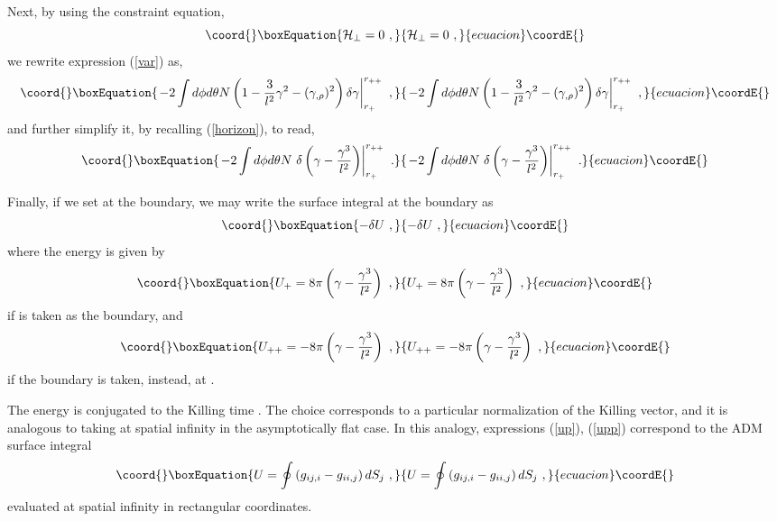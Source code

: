 \documentclass[a4paper,preprintnumbers,amsmath,amssymb]{revtex4}
\begin{document}
Next, by using the constraint equation,
\begin{equation}\coord{}\boxEquation{
{\cal H}_\perp = 0  \ ,
\label{constraint}
}{
{\cal H}_\perp = 0  \ ,
}{ecuacion}\coordE{}\end{equation}
we rewrite expression  (\ref{var}) as,
\begin{equation}\coord{}\boxEquation{
\left. -2 \int d\phi d\theta N \left(1-\frac{3}{l^2}\gamma^2 -
(\gamma_{,\rho})^2 \right)  \delta \gamma \right|^{r_{++}}_{r_+}  \ ,
\label{var2}
}{
\left. -2 \int d\phi d\theta N \left(1-\frac{3}{l^2}\gamma^2 -
(\gamma_{,\rho})^2 \right)  \delta \gamma \right|^{r_{++}}_{r_+}  \ ,
}{ecuacion}\coordE{}\end{equation}
and  further simplify it, by recalling (\ref{horizon}), to read,
\begin{equation}\coord{}\boxEquation{
 \left. - 2 \int d\phi d\theta  N \  \delta \left( \gamma - \frac{\gamma^3}{l^2} \right)
 \right|^{r_{++}}_{r_+}  \ .
\label{var3}
}{
 \left. - 2 \int d\phi d\theta  N \  \delta \left( \gamma - \frac{\gamma^3}{l^2} \right)
 \right|^{r_{++}}_{r_+}  \ .
}{ecuacion}\coordE{}\end{equation}

Finally, if we set \coordHE{} at the boundary, we may write the surface integral
at the boundary as
\begin{equation}\coord{}\boxEquation{
-\delta U \ ,
\label{}
}{
-\delta U \ ,
}{ecuacion}\coordE{}\end{equation}
where the energy \coordHE{} is given by
\begin{equation}\coord{}\boxEquation{
U_+= 8\pi \left( \gamma - \frac{\gamma^3}{l^2} \right) \ ,
\label{up}
}{
U_+= 8\pi \left( \gamma - \frac{\gamma^3}{l^2} \right) \ ,
}{ecuacion}\coordE{}\end{equation}
if \coordHE{} is taken as the boundary, and
\begin{equation}\coord{}\boxEquation{
U_{++}= -8\pi \left( \gamma - \frac{\gamma^3}{l^2} \right) \ ,
\label{upp}
}{
U_{++}= -8\pi \left( \gamma - \frac{\gamma^3}{l^2} \right) \ ,
}{ecuacion}\coordE{}\end{equation}
if the boundary is taken, instead, at \coordHE{}.

The energy \coordHE{} is conjugated to the Killing time \coordHE{}. The choice \coordHE{} corresponds to
a particular normalization of the Killing vector, and it is analogous to taking \coordHE{}
at spatial infinity in the asymptotically flat case. In this analogy, expressions (\ref{up}), (\ref{upp})
correspond to the ADM surface integral
\begin{equation}\coord{}\boxEquation{
U=\oint \left(g_{ij,i}-g_{ii,j}\right) dS_j \  ,
\label{adm}
}{
U=\oint \left(g_{ij,i}-g_{ii,j}\right) dS_j \  ,
}{ecuacion}\coordE{}\end{equation}
evaluated at spatial infinity in rectangular coordinates.
\end{document}
